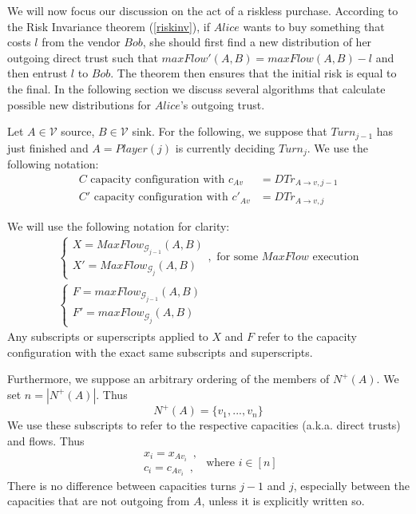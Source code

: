 We will now focus our discussion on the act of a riskless purchase. According to the Risk Invariance theorem (\ref{riskinv}),
if $Alice$ wants to buy something that costs $l$ from the vendor $Bob$, she should first find a new distribution of her
outgoing direct trust such that $maxFlow'\left(A, B\right) = maxFlow\left(A, B\right) - l$ and then entrust $l$ to $Bob$.
The theorem then ensures that the initial risk is equal to the final. In the following section we discuss several algorithms
that calculate possible new distributions for $Alice$'s outgoing trust.

Let $A \in \mathcal{V}$ source, $B \in \mathcal{V}$ sink. For the following, we suppose that $Turn_{j-1}$ has just finished
and $A = Player\left(j\right)$ is currently deciding $Turn_j$. We use the following notation:
\begin{align*}
  C \mbox{ capacity configuration with } c_{Av} &= DTr_{A \rightarrow v, j-1} \\
  C' \mbox{ capacity configuration with } c'_{Av} &= DTr_{A \rightarrow v, j}
\end{align*}

We will use the following notation for clarity:
\begin{equation*}
\begin{gathered}
  \begin{cases}
    X = MaxFlow_{\mathcal{G}_{j-1}}\left(A, B\right) \\
    X' = MaxFlow_{\mathcal{G}_j}\left(A, B\right)
  \end{cases}, \mbox{ for some } MaxFlow \mbox{ execution} \\
  \begin{cases}
    F = maxFlow_{\mathcal{G}_{j-1}}\left(A, B\right) \\
    F' = maxFlow_{\mathcal{G}_j}\left(A, B\right)
  \end{cases}
\end{gathered}
\end{equation*}
Any subscripts or superscripts applied to $X$ and $F$ refer to the capacity configuration with the exact same subscripts and
superscripts.

Furthermore, we suppose an arbitrary ordering of the members of $N^{+}\left(A\right)$. We set $n = |N^{+}\left(A\right)|$.
Thus
\begin{equation*}
  N^{+}\left(A\right) = \{v_1, ..., v_n\}
\end{equation*}
We use these subscripts to refer to the respective capacities (a.k.a. direct trusts) and flows. Thus
\begin{equation*}
  \begin{array}{l}
    x_i = x_{Av_i} \enspace, \\
    c_i = c_{Av_i} \enspace,
  \end{array}
  \mbox{ where } i \in [n]
\end{equation*}
There is no difference between capacities turns $j-1$ and $j$, especially between the capacities that are not outgoing from
$A$, unless it is explicitly written so.
